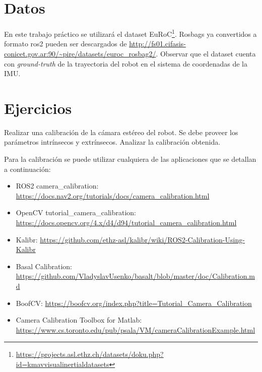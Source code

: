\documentclass[tp]{lcc}
\begin{document}
\section{Datos}
En este trabajo práctico se utilizará el dataset EuRoC\footnote{\url{https://projects.asl.ethz.ch/datasets/doku.php?id=kmavvisualinertialdatasets}}. Rosbags ya convertidos a formato ros2 pueden ser descargados de \url{http://fs01.cifasis-conicet.gov.ar:90/~pire/datasets/euroc_rosbag2/}. Observar que el dataset cuenta con \emph{ground-truth} de la trayectoria del robot en el sistema de coordenadas de la IMU.





\section{Ejercicios}

\ejercicio Realizar una calibración de la cámara estéreo del robot. Se debe proveer los parámetros intrínsecos y extrínsecos. Analizar la calibración obtenida.

\begin{nota}
    Para la calibración se puede utilizar cualquiera de las aplicaciones que se detallan a continuación:
    \begin{itemize}
        \item ROS2 camera\_calibration: \url{https://docs.nav2.org/tutorials/docs/camera_calibration.html}
        \item OpenCV tutorial\_camera\_calibration:\\ \url{https://docs.opencv.org/4.x/d4/d94/tutorial_camera_calibration.html}
        \item Kalibr: \url{https://github.com/ethz-asl/kalibr/wiki/ROS2-Calibration-Using-Kalibr}
        \item Basal Calibration: \url{https://github.com/VladyslavUsenko/basalt/blob/master/doc/Calibration.md}
        \item BoofCV: \url{https://boofcv.org/index.php?title=Tutorial_Camera_Calibration}
        \item Camera Calibration Toolbox for Matlab:\\ \url{https://www.cs.toronto.edu/pub/psala/VM/cameraCalibrationExample.html}
    \end{itemize}
\end{nota}
\end{document}
